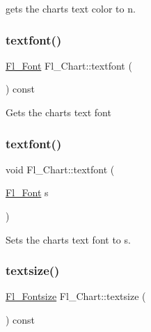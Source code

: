 gets the chart\textquotesingle{}s text color to {\ttfamily n}. \mbox{\label{class_fl___chart_a999e93ef294afe5e8f43dff89a9019ad}} 
\subsubsection{\texorpdfstring{textfont()}{textfont()}\hspace{0.1cm}{\footnotesize\ttfamily [1/2]}}
{\footnotesize\ttfamily \hyperlink{_enumerations_8_h_a2ac46d9f082834b969fffe490a03a709}{Fl\+\_\+\+Font} Fl\+\_\+\+Chart\+::textfont (\begin{DoxyParamCaption}{ }\end{DoxyParamCaption}) const\hspace{0.3cm}{\ttfamily [inline]}}

Gets the chart\textquotesingle{}s text font \mbox{\label{class_fl___chart_a2a2b74d83ee1458eebf3f6e55de7fb76}} 
\subsubsection{\texorpdfstring{textfont()}{textfont()}\hspace{0.1cm}{\footnotesize\ttfamily [2/2]}}
{\footnotesize\ttfamily void Fl\+\_\+\+Chart\+::textfont (\begin{DoxyParamCaption}\item[{\hyperlink{_enumerations_8_h_a2ac46d9f082834b969fffe490a03a709}{Fl\+\_\+\+Font}}]{s }\end{DoxyParamCaption})\hspace{0.3cm}{\ttfamily [inline]}}

Sets the chart\textquotesingle{}s text font to {\ttfamily s}. \mbox{\label{class_fl___chart_afe7366b51678d90b978f82fb41a83fa0}} 
\subsubsection{\texorpdfstring{textsize()}{textsize()}\hspace{0.1cm}{\footnotesize\ttfamily [1/2]}}
{\footnotesize\ttfamily \hyperlink{_enumerations_8_h_ad58927f5c691454480f7cd28362502f1}{Fl\+\_\+\+Fontsize} Fl\+\_\+\+Chart\+::textsize (\begin{DoxyParamCaption}{ }\end{DoxyParamCaption}) const\hspace{0.3cm}{\ttfamily [inline]}}

